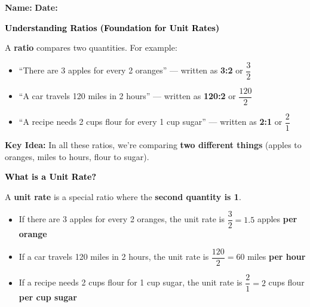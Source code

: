 \documentclass[12pt, letterpaper, fleqn]{article}
\begin{document}
\textbf{Name:} \underline{\hspace{5cm}}
\hfill
\textbf{Date:} \underline{\hspace{3cm}}\\

\begin{tcolorbox}[colback=customteal!20]
    \large\textcolor{black}{\textbf{Understanding Ratios (Foundation for Unit Rates)}}
\end{tcolorbox}

\vspace{3mm}

\noindent
A \textbf{ratio} compares two quantities. For example:

\begin{itemize}
    \item ``There are 3 apples for every 2 oranges'' — written as \textbf{3:2} or $\dfrac{3}{2}$
    \item ``A car travels 120 miles in 2 hours'' — written as \textbf{120:2} or $\dfrac{120}{2}$
    \item ``A recipe needs 2 cups flour for every 1 cup sugar'' — written as \textbf{2:1} or $\dfrac{2}{1}$
\end{itemize}

\medskip

\noindent
\textbf{Key Idea:} In all these ratios, we're comparing \textbf{two different things} (apples to oranges, miles to hours, flour to sugar).

\vspace{1cm}

\begin{tcolorbox}[colback=customteal!20]
\large\textcolor{black}{\textbf{What is a Unit Rate?}}
\end{tcolorbox}

\noindent
A \textbf{unit rate} is a special ratio where the \textbf{second quantity is 1}. 

\begin{itemize}
    \item If there are 3 apples for every 2 oranges, the unit rate is $\dfrac{3}{2} = 1.5$ apples \textbf{per orange}
    \item If a car travels 120 miles in 2 hours, the unit rate is $\dfrac{120}{2} = 60$ miles \textbf{per hour}
    \item If a recipe needs 2 cups flour for 1 cup sugar, the unit rate is $\dfrac{2}{1} = 2$ cups flour \textbf{per cup sugar}
\end{itemize}
\end{document}
